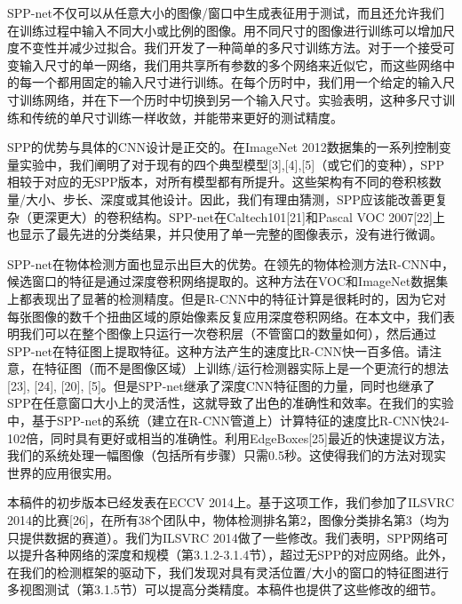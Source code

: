 \documentclass[../main.tex]{subfile}
\begin{document}
SPP-net不仅可以从任意大小的图像/窗口中生成表征用于测试，而且还允许我们在训练过程中输入不同大小或比例的图像。用不同尺寸的图像进行训练可以增加尺度不变性并减少过拟合。我们开发了一种简单的多尺寸训练方法。对于一个接受可变输入尺寸的单一网络，我们用共享所有参数的多个网络来近似它，而这些网络中的每一个都用固定的输入尺寸进行训练。在每个历时中，我们用一个给定的输入尺寸训练网络，并在下一个历时中切换到另一个输入尺寸。实验表明，这种多尺寸训练和传统的单尺寸训练一样收敛，并能带来更好的测试精度。

SPP的优势与具体的CNN设计是正交的。在ImageNet 2012数据集的一系列控制变量实验中，我们阐明了对于现有的四个典型模型[3],[4],[5]（或它们的变种），SPP相较于对应的无SPP版本，对所有模型都有所提升。这些架构有不同的卷积核数量/大小、步长、深度或其他设计。因此，我们有理由猜测，SPP应该能改善更复杂（更深更大）的卷积结构。SPP-net在Caltech101[21]和Pascal VOC 2007[22]上也显示了最先进的分类结果，并只使用了单一完整的图像表示，没有进行微调。

SPP-net在物体检测方面也显示出巨大的优势。在领先的物体检测方法R-CNN\cite{rcnn}中，候选窗口的特征是通过深度卷积网络提取的。这种方法在VOC和ImageNet数据集上都表现出了显著的检测精度。但是R-CNN中的特征计算是很耗时的，因为它对每张图像的数千个扭曲区域的原始像素反复应用深度卷积网络。在本文中，我们表明我们可以在整个图像上只运行一次卷积层（不管窗口的数量如何），然后通过SPP-net在特征图上提取特征。这种方法产生的速度比R-CNN快一百多倍。请注意，在特征图（而不是图像区域）上训练/运行检测器实际上是一个更流行的想法[23], [24], [20], [5]。但是SPP-net继承了深度CNN特征图的力量，同时也继承了SPP在任意窗口大小上的灵活性，这就导致了出色的准确性和效率。在我们的实验中，基于SPP-net的系统（建立在R-CNN管道上）计算特征的速度比R-CNN快24-102倍，同时具有更好或相当的准确性。利用EdgeBoxes[25]最近的快速提议方法，我们的系统处理一幅图像（包括所有步骤）只需0.5秒。这使得我们的方法对现实世界的应用很实用。

本稿件的初步版本已经发表在ECCV 2014上。基于这项工作，我们参加了ILSVRC 2014的比赛[26]，在所有38个团队中，物体检测排名第2，图像分类排名第3（均为只提供数据的赛道）。我们为ILSVRC 2014做了一些修改。我们表明，SPP网络可以提升各种网络的深度和规模（第3.1.2-3.1.4节），超过无SPP的对应网络。此外，在我们的检测框架的驱动下，我们发现对具有灵活位置/大小的窗口的特征图进行多视图测试（第3.1.5节）可以提高分类精度。本稿件也提供了这些修改的细节。
\end{document}
